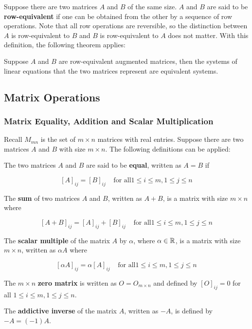 \documentclass[a4paper,12pt]{article}
\begin{document}
Suppose there are two matrices $A$ and $B$ of the same size. $A$ and $B$ are said to be \textbf{row-equivalent} if one can be obtained from the other by a sequence of row operations. Note that all row operations are reversible, so the distinction between $A$ is row-equivalent to $B$ and $B$ is row-equivalent to $A$ does not matter. With this definition, the following theorem applies:\n

\begin{pst}
  Suppose $A$ and $B$ are row-equivalent augmented matrices, then the systems of linear equations that the two matrices represent are equivalent systems.
\end{pst}

\subsection{Matrix Operations}
\subsubsection{Matrix Equality, Addition and Scalar Multiplication}
\begin{dft}
  Recall $M_{mn}$ is the set of $m\times n$ matrices with real entries. Suppose there are two matrices $A$ and $B$ with size $m\times n$. The following definitions can be applied:\n

  \begin{alist}
    \item The two matrices $A$ and $B$ are said to be \textbf{equal}, written as $A=B$ if

    $$[A]_{ij}=[B]_{ij}\;\;\;\;\text{for all}1\leq i\leq m,1\leq j\leq n$$

    \item The \textbf{sum} of two matrices $A$ and $B$, written as $A+B$, is a matrix with size $m\times n$ where

    $$[A+B]_{ij}=[A]_{ij}+[B]_{ij}\;\;\;\;\text{for all}1\leq i\leq m,1\leq j\leq n$$

    \item The \textbf{scalar multiple} of the matrix $A$ by $\alpha$, where $\alpha\in\mathbb{R}$, is a matrix with size $m\times n$, written as $\alpha A$ where

    $$[\alpha A]_{ij}=\alpha[A]_{ij}\;\;\;\;\text{for all}1\leq i\leq m,1\leq j\leq n$$

    \item The $m\times n$ \textbf{zero matrix} is written as $O=O_{m\times n}$ and defined by $[O]_{ij}=0$ for all $1\leq i\leq m,1\leq j\leq n$.

    \item The \textbf{addictive inverse} of the matrix $A$, written as $-A$, is defined by $-A=(-1)A$.
  \end{alist}
\end{dft}\n
\end{document}
